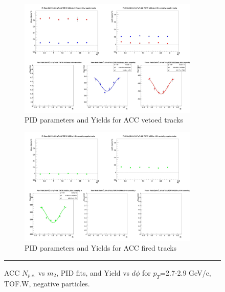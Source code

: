 \begin{figure}[H]
  \ContinuedFloat
    \begin{subfigure}{1\textwidth}
   \centering
   \includegraphics[width=0.94\textwidth]{hiptfits/neg/fitParams_tof2_cent0_ch0_pT-27-29.jpg}
    \caption{PID parameters and Yields for ACC vetoed tracks}
    \end{subfigure}    
    \begin{subfigure}{1\textwidth}
   \centering
   \includegraphics[width=0.94\textwidth]{hiptfits/neg/fitParams_tof3_cent0_ch0_pT-27-29.jpg}
    \caption{PID parameters and Yields for ACC fired tracks}
    \end{subfigure} 
    \rule{35em}{0.5pt}
  \caption[ACC $N_{p.e.}$ vs $m_2$, PID fits, and Yield vs $d\phi$ for $p_T$=2.7-2.9 GeV/c, TOF.W, negative particles.]{ACC $N_{p.e.}$ vs $m_2$, PID fits, and Yield vs $d\phi$ for $p_T$=2.7-2.9 GeV/c, TOF.W, negative particles.}
  \label{fig:acc27-29neg}
\end{figure}


